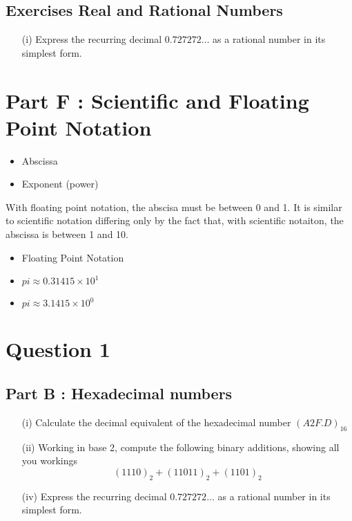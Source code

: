 \documentclass[]{report}
\begin{document}
\subsection*{Exercises Real and Rational Numbers}
\begin{itemize}
	\item[(i)] Express the recurring decimal $0.727272\ldots$ as a rational number in its simplest form.
\end{itemize}
\section*{Part F :  Scientific and Floating Point Notation}

\begin{itemize}
	\item Abscissa 
	\item Exponent (power)
\end{itemize}

With floating point notation, the abscisa must be between 0 and 1.
It is similar to scientific notation differing only by the fact that, with scientific notaiton, the abscissa is between 1 and 10.

\begin{itemize}
	\item Floating Point Notation
	\item $pi \approx 0.31415 \times 10^1$
	\item $pi \approx 3.1415 \times 10^0$
\end{itemize}




	\section*{Question 1}

	\subsection*{Part B :  Hexadecimal numbers}
	\begin{itemize}
		\item[(i)] Calculate the decimal equivalent of the hexadecimal number $(A2F.D)_{16}$
		\item[(ii)] Working in base 2, compute the following binary additions, showing all you workings
		\[(1110)_2 + (11011)_2 + (1101)_2 \]
		\item[(iv)] Express the recurring decimal $0.727272\ldots$ as a rational number in its simplest form.
	\end{itemize}
	
\end{document}
